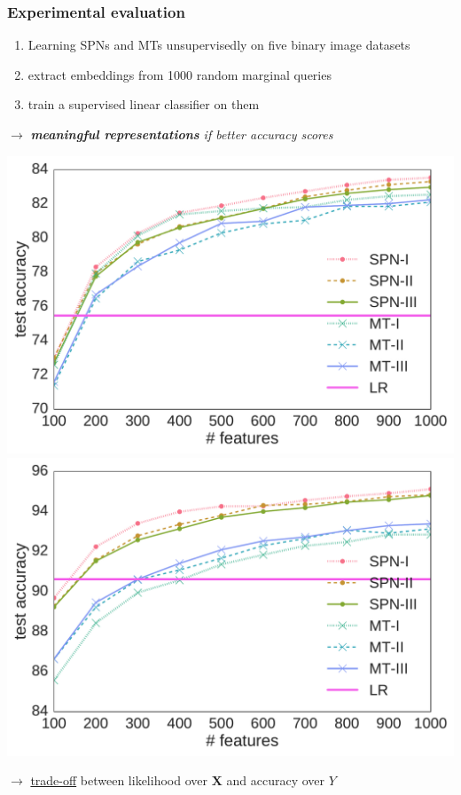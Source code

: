 \documentclass[xcolor={usenames,dvipsnames,svgnames}, compress]{beamer}
\begin{document}
\begin{frame}[t]
  \frametitle{Experimental evaluation}
  \small
  \begin{enumerate}[I]
  \item Learning \textsf{SPNs} and \textsf{MTs} unsupervisedly on five
    binary image datasets
  \item extract embeddings from 1000 random marginal queries
  \item train a supervised linear classifier on them 
  \end{enumerate}
  \hspace{15pt}$\rightarrow$ \emph{\textbf{meaningful representations} if better accuracy scores}\\[7pt]
  \begin{center}
     \includegraphics[width=0.47\linewidth]{figures/lines-ocr_letters}\hfill\includegraphics[width=0.47\linewidth]{figures/lines-bmnist}
   \end{center}
   \hspace{15pt}$\rightarrow$ \underline{trade-off} between likelihood over $\mathbf{X}$ and
   accuracy over $Y$
\end{frame}
\end{document}
